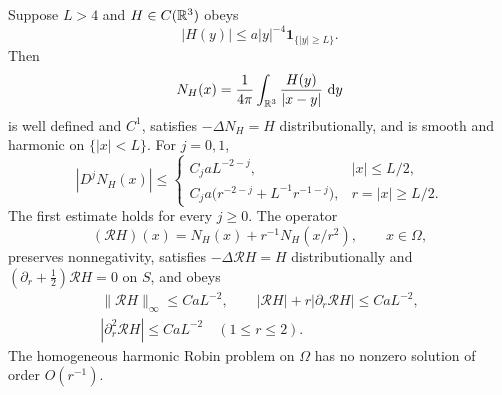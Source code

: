 \begin{lemma}\label{lem:newton}
Suppose $L>4$ and $H\in C(\mathbb R^3)$ obeys
\[
 |H(y)|\le a|y|^{-4}\mathbf1_{\{|y|\ge L\}}.
\]
Then
\[
 N_H(x)=\frac1{4\pi}\int_{\mathbb R^3}\frac{H(y)}{|x-y|}\,\mathop{}\!\mathrm d y
\]
is well defined and $C^1$, satisfies $-\Delta N_H=H$ distributionally,
and is smooth and harmonic on $\{|x|<L\}$.  For $j=0,1$,
\begin{equation}\label{eq:newton-bounds}
 |D^jN_H(x)|\le
 \begin{cases}
  C_j aL^{-2-j},& |x|\le L/2,\\
  C_j a\bigl(r^{-2-j}+L^{-1}r^{-1-j}\bigr),&r=|x|\ge L/2.
 \end{cases}
\end{equation}
The first estimate holds for every $j\ge0$.  The operator
\[
 (\mathcal RH)(x)=N_H(x)+r^{-1}N_H(x/r^2),\qquad x\in\Omega,
\]
preserves nonnegativity, satisfies
$-\Delta\mathcal RH=H$ distributionally and
$(\partial_r+\tfrac12)\mathcal RH=0$ on $S$, and obeys
\begin{equation}\label{eq:robin-operator-bounds}
 \begin{gathered}
 \|\mathcal RH\|_\infty\le CaL^{-2},\qquad
 |\mathcal RH|+r|\partial_r\mathcal RH|\le CaL^{-2},\\
 |\partial_r^2\mathcal RH|\le CaL^{-2}\quad(1\le r\le2).
 \end{gathered}
\end{equation}
The homogeneous harmonic Robin problem on $\Omega$ has no nonzero
solution of order $O(r^{-1})$.
\end{lemma}


